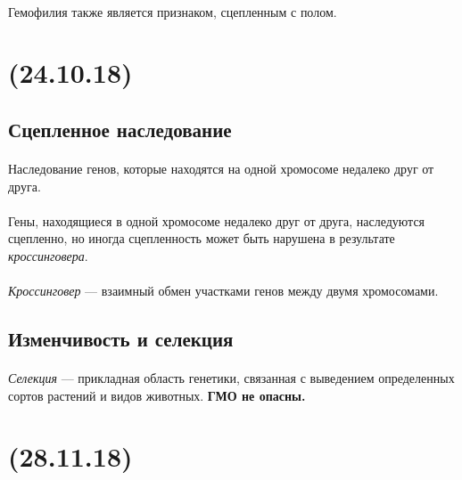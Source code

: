 \documentclass[dvipdfmx]{article}
\begin{document}
\paragraph{}
Гемофилия также является признаком, сцепленным с полом. 

\newpage
\noindent\makebox[\linewidth]{\rule{\paperwidth}{0.4pt}}
\section{(24.10.18)}
\noindent\makebox[\linewidth]{\rule{\paperwidth}{0.4pt}}

\subsection{Сцепленное наследование}

\paragraph{}
Наследование генов, которые находятся на одной хромосоме недалеко друг от друга.

\paragraph{}
Гены, находящиеся в одной хромосоме недалеко друг от друга, наследуются сцепленно, но иногда сцепленность может быть
нарушена в результате \emph{кроссинговера}.

\paragraph{}
\emph{Кроссинговер} --- взаимный обмен участками генов между двумя хромосомами.

\subsection{Изменчивость и селекция}

\paragraph{}
\emph{Селекция} --- прикладная область генетики, связанная с выведением определенных сортов растений и видов животных.
\textbf{ГМО не опасны.}


\newpage
\noindent\makebox[\linewidth]{\rule{\paperwidth}{0.4pt}}
\section{(28.11.18)}
\noindent\makebox[\linewidth]{\rule{\paperwidth}{0.4pt}}
\end{document}
